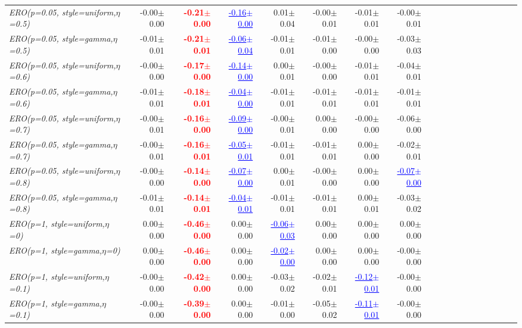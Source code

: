 \documentclass[nohyperref]{article}
\theoremstyle{plain}
\theoremstyle{definition}
\theoremstyle{remark}
\newcommand{\red}[1]{\textcolor{red}{\textbf{#1}}}
\newcommand{\blue}[1]{\textcolor{blue}{\underline{#1}}}
\begin{document}
\begin{table*}[!ht]
{\begin{tabular}{lrrrrrrrrrrrrrrrrrr}
			{\it ERO(p=0.05, style=uniform,$\eta$=0.5)} & -0.00$\pm$0.00 & \red{-0.21$\pm$0.00} & \blue{-0.16$\pm$0.00} & 0.01$\pm$0.04 & -0.00$\pm$0.01 & -0.01$\pm$0.01 & -0.00$\pm$0.01 \\
			{\it ERO(p=0.05, style=gamma,$\eta$=0.5)} & -0.01$\pm$0.01 & \red{-0.21$\pm$0.01} & \blue{-0.06$\pm$0.04} & -0.01$\pm$0.01 & -0.01$\pm$0.00 & -0.00$\pm$0.00 & -0.03$\pm$0.03 \\
			{\it ERO(p=0.05, style=uniform,$\eta$=0.6)} & -0.00$\pm$0.00 & \red{-0.17$\pm$0.00} & \blue{-0.14$\pm$0.00} & 0.00$\pm$0.01 & -0.00$\pm$0.00 & -0.01$\pm$0.01 & -0.04$\pm$0.01 \\
			{\it ERO(p=0.05, style=gamma,$\eta$=0.6)} & -0.01$\pm$0.01 & \red{-0.18$\pm$0.01} & \blue{-0.04$\pm$0.00} & -0.01$\pm$0.01 & -0.01$\pm$0.01 & -0.01$\pm$0.01 & -0.01$\pm$0.01 \\
			{\it ERO(p=0.05, style=uniform,$\eta$=0.7)} & -0.00$\pm$0.01 & \red{-0.16$\pm$0.00} & \blue{-0.09$\pm$0.00} & -0.00$\pm$0.01 & 0.00$\pm$0.00 & -0.00$\pm$0.00 & -0.06$\pm$0.00 \\
			{\it ERO(p=0.05, style=gamma,$\eta$=0.7)} & -0.00$\pm$0.01 & \red{-0.16$\pm$0.01} & \blue{-0.05$\pm$0.01} & -0.01$\pm$0.01 & -0.01$\pm$0.01 & 0.00$\pm$0.00 & -0.02$\pm$0.01 \\
			{\it ERO(p=0.05, style=uniform,$\eta$=0.8)} & -0.00$\pm$0.00 & \red{-0.14$\pm$0.00} & \blue{-0.07$\pm$0.00} & 0.00$\pm$0.01 & -0.00$\pm$0.00 & 0.00$\pm$0.00 & \blue{-0.07$\pm$0.00} \\
			{\it ERO(p=0.05, style=gamma,$\eta$=0.8)} & -0.01$\pm$0.01 & \red{-0.14$\pm$0.01} & \blue{-0.04$\pm$0.01} & -0.01$\pm$0.01 & -0.01$\pm$0.01 & 0.00$\pm$0.01 & -0.03$\pm$0.02 \\
			{\it ERO(p=1, style=uniform,$\eta$=0)} & 0.00$\pm$0.00 & \red{-0.46$\pm$0.00} & 0.00$\pm$0.00 & \blue{-0.06$\pm$0.03} & 0.00$\pm$0.00 & 0.00$\pm$0.00 & 0.00$\pm$0.00 \\
			{\it ERO(p=1, style=gamma,$\eta$=0)} & 0.00$\pm$0.00 & \red{-0.46$\pm$0.00} & 0.00$\pm$0.00 & \blue{-0.02$\pm$0.00} & 0.00$\pm$0.00 & 0.00$\pm$0.00 & -0.00$\pm$0.00 \\
			{\it ERO(p=1, style=uniform,$\eta$=0.1)} & -0.00$\pm$0.00 & \red{-0.42$\pm$0.00} & 0.00$\pm$0.00 & -0.03$\pm$0.02 & -0.02$\pm$0.01 & \blue{-0.12$\pm$0.01} & -0.00$\pm$0.00 \\
			{\it ERO(p=1, style=gamma,$\eta$=0.1)} & -0.00$\pm$0.00 & \red{-0.39$\pm$0.00} & 0.00$\pm$0.00 & -0.01$\pm$0.00 & -0.05$\pm$0.02 & \blue{-0.11$\pm$0.01} & -0.00$\pm$0.00 \\

\end{tabular}}
\end{table*}
\end{document}
